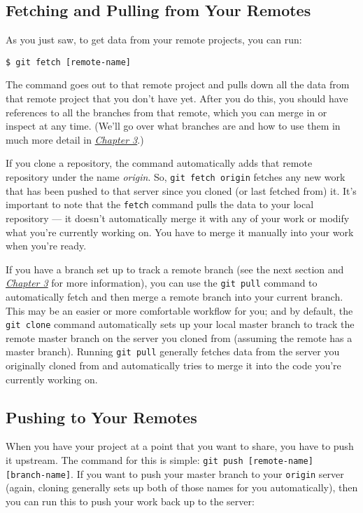 \documentclass[a4paper]{book}
\newcounter{tab}[chapter]
\newcommand{\prechap}{Chapter }
\newcommand{\postchap}{}
\newcommand{\chapref}[1]{\hyperref[chap:#1]{\prechap #1\postchap}}
\begin{document}
\subsection{Fetching and Pulling from Your Remotes}

As you just saw, to get data from your remote projects, you can run:

\begin{shaded}\begin{verbatim}
$ git fetch [remote-name]
\end{verbatim}\end{shaded}

The command goes out to that remote project and pulls down all the data from that remote project that you don't have yet. After you do this, you should have references to all the branches from that remote, which you can merge in or inspect at any time. (We'll go over what branches are and how to use them in much more detail in \emph{\chapref{3}}.)

If you clone a repository, the command automatically adds that remote repository under the name \emph{origin}. So, \texttt{git fetch origin} fetches any new work that has been pushed to that server since you cloned (or last fetched from) it. It's important to note that the \texttt{fetch} command pulls the data to your local repository --- it doesn't automatically merge it with any of your work or modify what you're currently working on. You have to merge it manually into your work when you're ready.

If you have a branch set up to track a remote branch (see the next section and \emph{\chapref{3}} for more information), you can use the \texttt{git pull} command to automatically fetch and then merge a remote branch into your current branch. This may be an easier or more comfortable workflow for you; and by default, the \texttt{git clone} command automatically sets up your local master branch to track the remote master branch on the server you cloned from (assuming the remote has a master branch). Running \texttt{git pull} generally fetches data from the server you originally cloned from and automatically tries to merge it into the code you're currently working on.

\subsection{Pushing to Your Remotes}

When you have your project at a point that you want to share, you have to push it upstream. The command for this is simple: \texttt{git push {[}remote-name{]} {[}branch-name{]}}. If you want to push your master branch to your \texttt{origin} server (again, cloning generally sets up both of those names for you automatically), then you can run this to push your work back up to the server:
\end{document}
